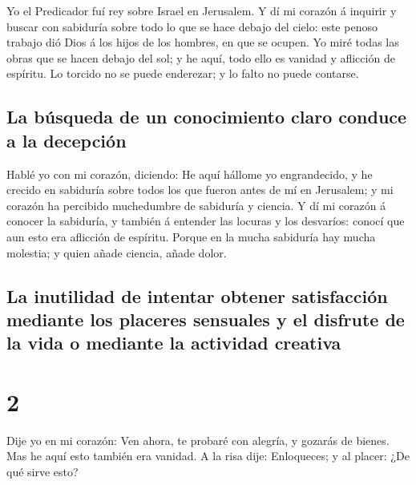  Yo el Predicador fuí rey sobre Israel en Jerusalem.
 Y dí mi corazón á inquirir y buscar con sabiduría sobre
todo lo que se hace debajo del cielo: este penoso trabajo dió Dios á los
hijos de los hombres, en que se ocupen.  Yo miré todas
las obras que se hacen debajo del sol; y he aquí, todo ello es vanidad y
aflicción de espíritu.  Lo torcido no se puede enderezar;
y lo falto no puede contarse.

\hypertarget{la-buxfasqueda-de-un-conocimiento-claro-conduce-a-la-decepciuxf3n}{%
\subsection{La búsqueda de un conocimiento claro conduce a la
decepción}\label{la-buxfasqueda-de-un-conocimiento-claro-conduce-a-la-decepciuxf3n}}

 Hablé yo con mi corazón, diciendo: He aquí hállome yo
engrandecido, y he crecido en sabiduría sobre todos los que fueron antes
de mí en Jerusalem; y mi corazón ha percibido muchedumbre de sabiduría y
ciencia.  Y dí mi corazón á conocer la sabiduría, y
también á entender las locuras y los desvaríos: conocí que aun esto era
aflicción de espíritu.  Porque en la mucha sabiduría hay
mucha molestia; y quien añade ciencia, añade dolor.

\hypertarget{la-inutilidad-de-intentar-obtener-satisfacciuxf3n-mediante-los-placeres-sensuales-y-el-disfrute-de-la-vida-o-mediante-la-actividad-creativa}{%
\subsection{La inutilidad de intentar obtener satisfacción mediante los
placeres sensuales y el disfrute de la vida o mediante la actividad
creativa}\label{la-inutilidad-de-intentar-obtener-satisfacciuxf3n-mediante-los-placeres-sensuales-y-el-disfrute-de-la-vida-o-mediante-la-actividad-creativa}}

\hypertarget{section-1}{%
\section{2}\label{section-1}}

 Dije yo en mi corazón: Ven ahora, te probaré con alegría,
y gozarás de bienes. Mas he aquí esto también era vanidad.
 A la risa dije: Enloqueces; y al placer: ¿De qué sirve
esto?

